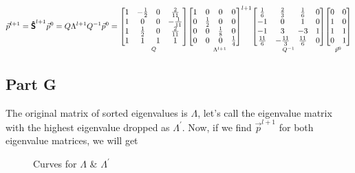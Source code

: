 \documentclass[12pt,a4paper]{article}
\newcommand{\mat}[1]{\boldsymbol { \mathsf{#1}} }
\begin{document}
$$
\Vec{p}^{l+1} = \mat{\Hat{S}}^{l+1}\Vec{p}^{0}={Q}{\Lambda}^{l+1}Q^{-1}\Vec{p}^{0}
 = \underset{Q}{
\begin{bmatrix}
1 & -\frac{1}{2} & 0 & \frac{2}{11}\\
1 & 0 & 0 & -\frac{1}{11}\\
1 & \frac{1}{2} & 0 & \frac{2}{11}\\
1 & 1 & 1 & 1
\end{bmatrix}}\underset{\Lambda^{l+1}}{
\begin{bmatrix}
1 & 0 & 0 & 0\\
0 & \frac{1}{2} & 0 & 0\\
0 & 0 & \frac{1}{8} & 0\\
0 & 0 & 0 & \frac{1}{4}
\end{bmatrix}^{l+1}}\underset{Q^{-1}}{
\begin{bmatrix}\frac{1}{6}&\frac{2}{3}&\frac{1}{6}&0\\ -1&0&1&0\\ -1&3&-3&1\\ \frac{11}{6}&-\frac{11}{3}&\frac{11}{6}&0\end{bmatrix}}
\underset{\Vec{p}^{0}}{\begin{bmatrix}0&0\\ 1&0\\ 1&1\\ 0&1\end{bmatrix}}
$$



\subsection{Part G}
The original matrix of sorted eigenvalues is $\Lambda$, let's call the eigenvalue matrix with the highest eigenvalue dropped as $\Lambda^{'}$. Now, if we find $\Vec{p}^{l+1}$ for both eigenvalue matrices, we will get

\begin{wrapfigure}[8]{R}{6cm}
\centering
{}
\caption{Curves for $\Lambda$ \& $\Lambda^{'}$}
\end{wrapfigure}
\end{document}
